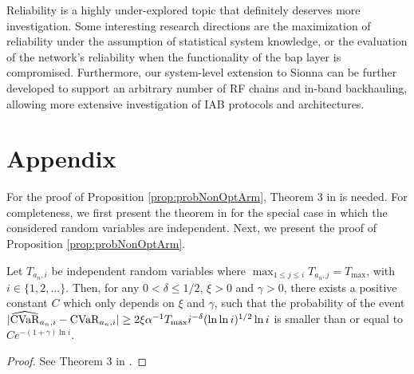 Reliability is a highly under-explored topic that definitely deserves more investigation. Some interesting research directions are the maximization of reliability under the assumption of statistical system knowledge, or the evaluation of the network's reliability when the functionality of the \gls{bap} layer is compromised.
Furthermore, our system-level extension to Sionna can be further developed to support an arbitrary number of RF chains and in-band backhauling, allowing more extensive investigation of IAB protocols and architectures.

\section*{Appendix}
\label{sec:appendix}
For the proof of Proposition \ref{prop:probNonOptArm}, Theorem 3 in \cite{Luo2017} is needed. For completeness, we first present the theorem in \cite{Luo2017} for the special case in which the considered random variables are independent. Next, we present the proof of Proposition \ref{prop:probNonOptArm}.
\begin{theorem} \label{eq:Theorem2_part2}
Let $T_{a_n,i}$ be independent random variables where $\max_{1\leq j\leq i}{T_{a_n,j}} = T_\mathrm{max}$, with $i\in\{1,2,...\}$.
Then, for any $0 < \delta \leq 1/2$, $\xi > 0$ and $\gamma > 0$, there exists a positive constant $C$ which only depends on $\xi$ and $\gamma$, such that the probability of the event $|{\widehat{\mathrm{CVaR}}}_{a_n,i}-{\mathrm{CVaR}}_{a_n,i}| \geq 2\xi\alpha^{-1}T_{\max} i^{-\delta}(\ln{\ln{i}})^{1/2}\ln{i}$ is smaller than or equal to $Ce^{-(1+\gamma)\ln i}$.
\end{theorem}
\begin{proof}
See Theorem 3 in \cite{Luo2017}.
\end{proof}

